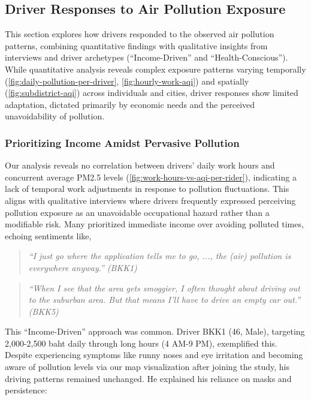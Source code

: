 \subsection{Driver Responses to Air Pollution Exposure}
This section explores how drivers responded to the observed air pollution patterns, combining quantitative findings with qualitative insights from interviews and driver archetypes (``Income-Driven'' and ``Health-Conscious'').
While quantitative analysis reveals complex exposure patterns varying temporally (\autoref{fig:daily-pollution-per-driver}, \autoref{fig:hourly-work-aqi}) and spatially (\autoref{fig:subdistrict-aqi}) across individuals and cities,
driver responses show limited adaptation, dictated primarily by economic needs and the perceived unavoidability of pollution.

\subsubsection{Prioritizing Income Amidst Pervasive Pollution}
Our analysis reveals no correlation between drivers' daily work hours and concurrent average PM2.5 levels (\autoref{fig:work-hours-vs-aqi-per-rider}), indicating a lack of temporal work adjustments in response to pollution fluctuations.
This aligns with qualitative interviews where drivers frequently expressed perceiving pollution exposure as an unavoidable occupational hazard rather than a modifiable risk.
Many prioritized immediate income over avoiding polluted times, echoing sentiments like,

\begin{quote}
  \em
``I just go where the application tells me to go, ..., the (air) pollution is everywhere anyway.'' (BKK1)
\end{quote}

\begin{quote}
  \em
    ``When I see that the area gets smoggier, I often thought about driving out to the suburban area. But that means I'll have to drive an empty car out.'' (BKK5)
\end{quote}

This ``Income-Driven'' approach was common.
Driver BKK1 (46, Male), targeting 2,000-2,500 baht daily through long hours (4 AM-9 PM), exemplified this.
Despite experiencing symptoms like runny noses and eye irritation and becoming aware of pollution levels via our map visualization after joining the study, his driving patterns remained unchanged.
He explained his reliance on masks and persistence:

